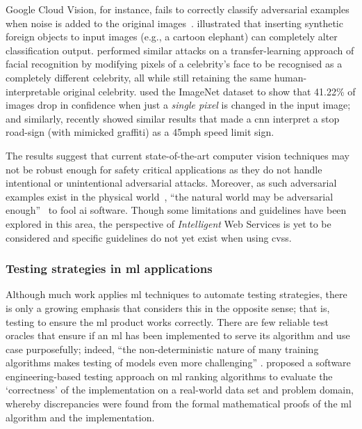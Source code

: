 Google Cloud Vision, for instance, fails to correctly classify adversarial examples when noise is added to the original images~\citep{Hosseini:2018jr}. \citet{Rosenfeld:2018ut} illustrated that inserting synthetic foreign objects to input images (e.g., a cartoon elephant) can completely alter classification output. \citet{Wang:2018vl} performed similar attacks on a transfer-learning approach of facial recognition by modifying pixels of a celebrity's face to be recognised as a completely different celebrity, all while still retaining the same human-interpretable original celebrity. \citet{Su:2017uw} used the ImageNet dataset to show that 41.22\% of images drop in confidence when just a \textit{single pixel} is changed in the input image; and similarly, \citet{Eykholt:2018vk} recently showed similar results that made a \gls{cnn} interpret a stop road-sign (with mimicked graffiti) as a 45mph speed limit sign.

The results suggest that current state-of-the-art computer vision techniques may not be robust enough for safety critical applications as they do not handle intentional or unintentional adversarial attacks. Moreover, as such adversarial examples exist in the physical world~\citep{Kurakin:2016vw,Eykholt:2018vk}, ``the natural world may be adversarial enough''~\citep{Pezzementi:2018tq} to fool \gls{ai} software. Though some limitations and guidelines have been explored in this area, the perspective of \textit{Intelligent} Web Services is yet to be considered and specific guidelines do not yet exist when using \glspl{cvs}.

\subsubsection{Testing strategies in \gls{ml} applications}

Although much work applies \gls{ml} techniques to automate testing strategies, there is only a growing emphasis that considers this in the opposite sense; that is, testing to ensure the \gls{ml} product works correctly. There are few reliable test oracles that ensure if an \gls{ml} has been implemented to serve its algorithm and use case purposefully; indeed, ``the non-deterministic nature of many training algorithms makes testing of models even more challenging'' \citep{Arpteg2018}.
\citet{murphy2007approach} proposed a software engineering-based testing approach on \gls{ml} ranking algorithms to evaluate the `correctness' of the implementation on a real-world data set and problem domain, whereby discrepancies were found from the formal mathematical proofs of the \gls{ml} algorithm and the implementation. 

